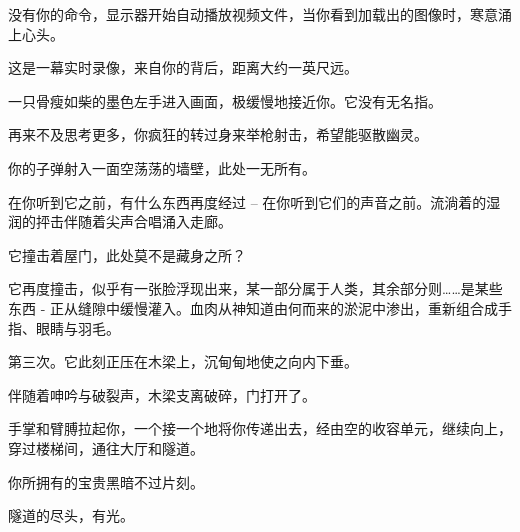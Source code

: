 \begin{scpbox}

没有你的命令，显示器开始自动播放视频文件，当你看到加载出的图像时，寒意涌上心头。

这是一幕实时录像，来自你的背后，距离大约一英尺远。

一只骨瘦如柴的墨色左手进入画面，极缓慢地接近你。它没有无名指。

再来不及思考更多，你疯狂的转过身来举枪射击，希望能驱散幽灵。

你的子弹射入一面空荡荡的墙壁，此处一无所有。

在你听到它之前，有什么东西再度经过 – 在你听到它们的声音之前。流淌着的湿润的抨击伴随着尖声合唱涌入走廊。

它撞击着屋门，此处莫不是藏身之所？

它再度撞击，似乎有一张脸浮现出来，某一部分属于人类，其余部分则……是某些东西 - 正从缝隙中缓慢灌入。血肉从神知道由何而来的淤泥中渗出，重新组合成手指、眼睛与羽毛。

第三次。它此刻正压在木梁上，沉甸甸地使之向内下垂。

伴随着呻吟与破裂声，木梁支离破碎，门打开了。

手掌和臂膊拉起你，一个接一个地将你传递出去，经由空的收容单元，继续向上，穿过楼梯间，通往大厅和隧道。

你所拥有的宝贵黑暗不过片刻。

隧道的尽头，有光。

\end{scpbox}